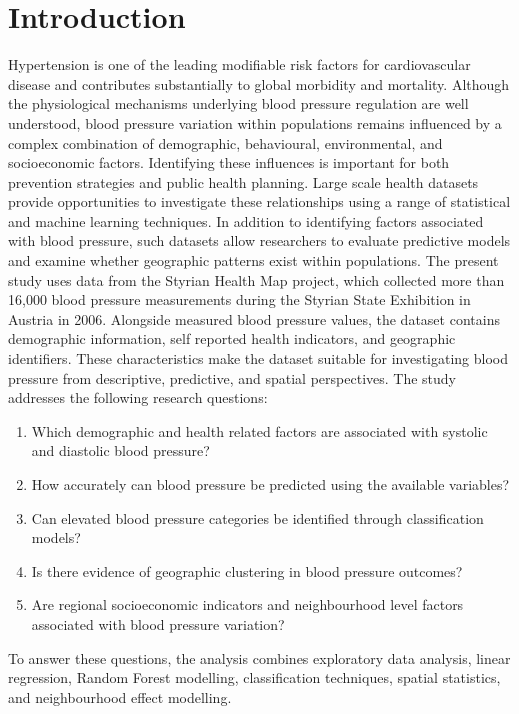 \documentclass[12pt,a4paper]{article}
\begin{document}
\section{Introduction}
Hypertension is one of the leading modifiable risk factors for cardiovascular disease and contributes substantially to global morbidity and mortality. Although the physiological mechanisms underlying blood pressure regulation are well understood, blood pressure variation within populations remains influenced by a complex combination of demographic, behavioural, environmental, and socioeconomic factors. Identifying these influences is important for both prevention strategies and public health planning.
Large scale health datasets provide opportunities to investigate these relationships using a range of statistical and machine learning techniques. In addition to identifying factors associated with blood pressure, such datasets allow researchers to evaluate predictive models and examine whether geographic patterns exist within populations.
The present study uses data from the Styrian Health Map project, which collected more than 16,000 blood pressure measurements during the Styrian State Exhibition in Austria in 2006. Alongside measured blood pressure values, the dataset contains demographic information, self reported health indicators, and geographic identifiers. These characteristics make the dataset suitable for investigating blood pressure from descriptive, predictive, and spatial perspectives.
The study addresses the following research questions:
\begin{enumerate}
\item Which demographic and health related factors are associated with systolic and diastolic blood pressure?
\item How accurately can blood pressure be predicted using the available variables?
\item Can elevated blood pressure categories be identified through classification models?
\item Is there evidence of geographic clustering in blood pressure outcomes?
\item Are regional socioeconomic indicators and neighbourhood level factors associated with blood pressure variation?
\end{enumerate}
To answer these questions, the analysis combines exploratory data analysis, linear regression, Random Forest modelling, classification techniques, spatial statistics, and neighbourhood effect modelling.

\end{document}
